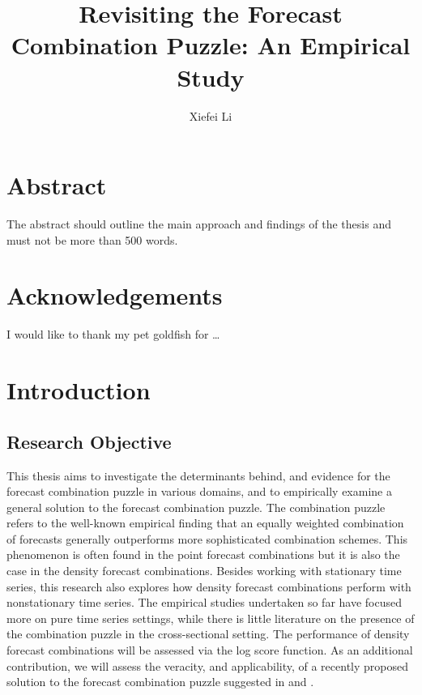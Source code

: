 \documentclass{monashthesis}
\author{Xiefei Li}
\title{Revisiting the Forecast Combination Puzzle: An Empirical Study}
\begin{document}

\titlepage

{\sf\tighttoc\doublespacing}

\clearpage{}\setcounter{page}{1}

\hypertarget{abstract}{%
\chapter*{Abstract}\label{abstract}}

The abstract should outline the main approach and findings of the thesis and must not be more than 500 words.

\newpage

\hypertarget{acknowledgements}{%
\chapter*{Acknowledgements}\label{acknowledgements}}

I would like to thank my pet goldfish for \dots

\hypertarget{introduction}{%
\chapter{Introduction}\label{introduction}}

\hypertarget{research-objective}{%
\section{Research Objective}\label{research-objective}}

This thesis aims to investigate the determinants behind, and evidence for the forecast combination puzzle in various domains, and to empirically examine a general solution to the forecast combination puzzle. The combination puzzle refers to the well-known empirical finding that an equally weighted combination of forecasts generally outperforms more sophisticated combination schemes. This phenomenon is often found in the point forecast combinations but it is also the case in the density forecast combinations. Besides working with stationary time series, this research also explores how density forecast combinations perform with nonstationary time series. The empirical studies undertaken so far have focused more on pure time series settings, while there is little literature on the presence of the combination puzzle in the cross-sectional setting. The performance of density forecast combinations will be assessed via the log score function. As an additional contribution, we will assess the veracity, and applicability, of a recently proposed solution to the forecast combination puzzle suggested in \textcite{ZMFP22} and \textcite{FZMP23}.
\end{document}
